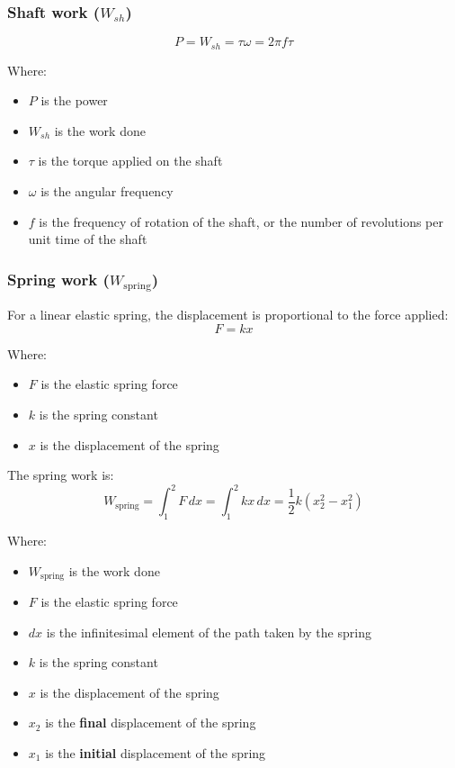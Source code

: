 \documentclass[11pt]{article}
\begin{document}
\newpage
\subsubsection{Shaft work (\(W_{sh}\))}
\label{sec:orgb6864b4}
\[P = W_{sh} = \tau \omega = 2 \pi f \tau\]

Where:
\begin{itemize}
\item \(P\) is the power
\item \(W_{sh}\) is the work done
\item \(\tau\) is the torque applied on the shaft
\item \(\omega\) is the angular frequency
\item \(f\) is the frequency of rotation of the shaft, or the number of revolutions per unit time of the shaft
\end{itemize}

\newpage
\subsubsection{Spring work (\(W_{\text{spring}}\))}
\label{sec:orge5fbfe0}
For a linear elastic spring, the displacement is proportional to the force applied:
\[F = kx\]

Where:
\begin{itemize}
\item \(F\) is the elastic spring force
\item \(k\) is the spring constant
\item \(x\) is the displacement of the spring
\end{itemize}

The spring work is:
\[W_{\text{spring}} = \int_1^2 F \, dx = \int_1^2 kx \, dx = \frac{1}{2}k \left(x_2^2 - x_1^2 \right)\]

Where:
\begin{itemize}
\item \(W_{\text{spring}}\) is the work done
\item \(F\) is the elastic spring force
\item \(dx\) is the infinitesimal element of the path taken by the spring
\item \(k\) is the spring constant
\item \(x\) is the displacement of the spring
\item \(x_2\) is the \textbf{final} displacement of the spring
\item \(x_1\) is the \textbf{initial} displacement of the spring
\end{itemize}
\end{document}
